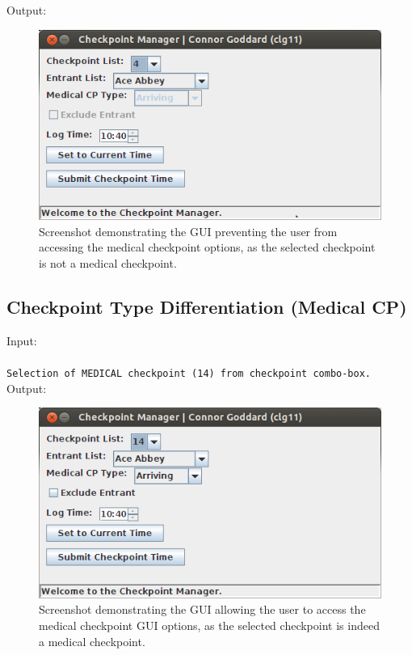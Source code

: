 \documentclass[a4paper, 10pt]{article}
\begin{document}
Output:
\begin{figure}[ht!]
\centering
\includegraphics[scale=0.6]{cm-cpnormal.png}
\caption{Screenshot demonstrating the GUI preventing the user from accessing the medical checkpoint options, as the selected checkpoint is not a medical checkpoint.}
\end{figure}

\subsection{Checkpoint Type Differentiation (Medical CP)}

Input: \\\\
\verb+Selection of MEDICAL checkpoint (14) from checkpoint combo-box.+\\

Output:
\begin{figure}[ht!]
\centering
\includegraphics[scale=0.6]{cm-cpmedical.png}
\caption{Screenshot demonstrating the GUI allowing the user to access the medical checkpoint GUI options, as the selected checkpoint is indeed a medical checkpoint.}
\end{figure}
\end{document}
